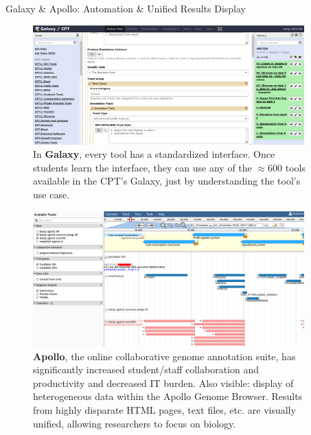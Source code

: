 \documentclass[final,t,20pt]{beamer}
\begin{document}
\begin{frame}[fragile]
\begin{columns}[t]
\begin{column}{.36\linewidth}
        \end{column}
        \begin{column}{.60\linewidth}
            \begin{block}{Galaxy \& Apollo: Automation \& Unified Results Display }
                \begin{figure}
                    \includegraphics[width=0.98\textwidth]{./media/galaxy.png}
                    \caption{In \textbf{Galaxy}, every tool has a standardized
                        interface. Once students learn the interface, they can
                        use any of the $\approx$600 tools available in the
                        CPT's Galaxy, just by understanding the tool's use case.}
                \end{figure}
                \begin{figure}
                    \includegraphics[width=0.98\textwidth]{./media/apollo.png}
                    \caption{\textbf{Apollo}, the online collaborative genome annotation
                    suite, has significantly increased student/staff
                    collaboration and productivity and decreased IT burden.
                    Also visible: display of heterogeneous data within the Apollo
                    Genome Browser. Results from highly disparate HTML pages,
                    text files, etc. are visually unified, allowing researchers to
                    focus on biology.}
                \end{figure}


\end{block}
\end{column}
\end{columns}
\end{frame}
\end{document}

